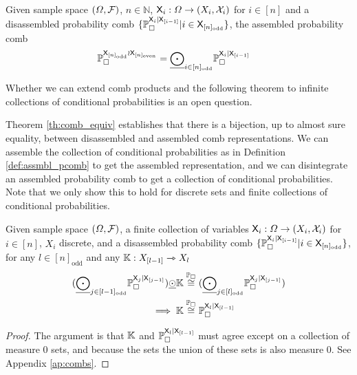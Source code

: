 \begin{definition}\label{def:assmbl_pcomb}
Given sample space $(\Omega,\mathcal{F})$, $n\in \mathbb{N}$, $\mathsf{X}_{i}:\Omega\to (X_i,\mathcal{X}_i)$ for $i\in [n]$ and a disassembled probability comb $\{\mathbb{P}_\square^{\mathsf{X}_{i}|\mathsf{X}_{[i-1]}}|i\in \mathsf{X}_{[n]_{\text{odd}}}\}$, the assembled probability comb
\begin{align}
	\mathbb{P}_\square^{\mathsf{X}_{[n]_{\text{odd}}}\wr \mathsf{X}_{[n]_{\text{even}}}} &= \underline{\bigodot}_{i\in [n]_{\text{odd}}}\mathbb{P}_\square^{\mathsf{X}_{i}|\mathsf{X}_{[i-1]}}
\end{align}
\end{definition}

Whether we can extend comb products and the following theorem to infinite collections of conditional probabilities is an open question.

Theorem \ref{th:comb_equiv} establishes that there is a bijection, up to almost sure equality, between disassembled and assembled comb representations. We can assemble the collection of conditional probabilities as in Definition \ref{def:assmbl_pcomb} to get the assembled representation, and we can disintegrate an assembled probability comb to get a collection of conditional probabilities. Note that we only show this to hold for discrete sets and finite collections of conditional probabilities.

\begin{theorem}\label{th:comb_equiv}
Given sample space $(\Omega,\mathcal{F})$, a finite collection of variables $\mathsf{X}_{i}:\Omega\to (X_i,\mathcal{X}_i)$ for $i\in [n]$, $X_i$ discrete, and a disassembled probability comb $\{\mathbb{P}_\square^{\mathsf{X}_{i}|\mathsf{X}_{[i-1]}}|i\in \mathsf{X}_{[n]_{\text{odd}}}\}$, for any $l\in [n]_{\mathrm{odd}}$ and any $\mathbb{K}:X_{[l-1]}\rightarrowtriangle X_l$
\begin{align}
	(\underline{\bigodot}_{j\in [l-1]_{\mathrm{odd}}} \mathbb{P}_\square^{\mathsf{X}_{j}|\mathsf{X}_{[j-1]}}) \underline{\odot} \mathbb{K} &\overset{\mathbb{P}_\square}{\cong} (\underline{\bigodot}_{j\in [l]_{\mathrm{odd}}} \mathbb{P}_\square^{\mathsf{X}_{j}|\mathsf{X}_{[j-1]}})\\
	\implies \mathbb{K} &\overset{\mathbb{P}_\square}{\cong} \mathbb{P}_\square^{\mathsf{X}_{l}|\mathsf{X}_{[l-1]}}
\end{align}
\end{theorem}

\begin{proof}
The argument is that $\mathbb{K}$ and $\mathbb{P}_\square^{\mathsf{X}_{l}|\mathsf{X}_{[l-1]}}$ must agree except on a collection of measure 0 sets, and because the sets the union of these sets is also measure 0. See Appendix \ref{ap:combs}.
\end{proof}

